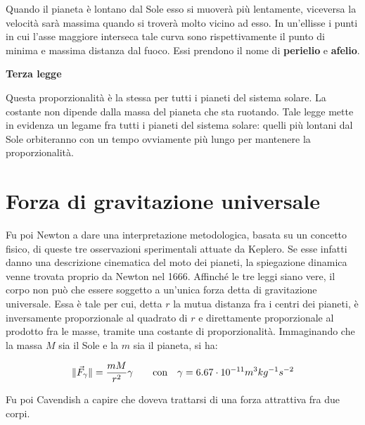 \FloatBarrier
Quando il pianeta è lontano dal Sole esso si muoverà più lentamente, viceversa la velocità sarà massima quando si troverà molto vicino ad esso. In un'ellisse i punti in cui l'asse maggiore interseca tale curva sono rispettivamente il punto di minima e massima distanza dal fuoco. Essi prendono il nome di \textbf{perielio} e \textbf{afelio}.

\textbf{Terza legge} 

\noindent{}

Questa proporzionalità è la stessa per tutti i pianeti del sistema solare. La costante non dipende dalla massa del pianeta che sta ruotando. Tale legge mette in evidenza un legame fra tutti i pianeti del sistema solare: quelli più lontani dal Sole orbiteranno con un tempo ovviamente più lungo per mantenere la proporzionalità.

\section{Forza di gravitazione universale}

Fu poi Newton a dare una interpretazione metodologica, basata su un concetto fisico, di queste tre osservazioni sperimentali attuate da Keplero. Se esse infatti danno una descrizione cinematica del moto dei pianeti, la spiegazione dinamica venne trovata proprio da Newton nel 1666. Affinché le tre leggi siano vere, il corpo non può che essere soggetto a un'unica forza detta di gravitazione universale. Essa è tale per cui, detta $r$ la mutua distanza fra i centri dei pianeti,  è inversamente proporzionale al quadrato di $r$ e direttamente proporzionale al prodotto fra le masse, tramite una costante di proporzionalità. Immaginando che la massa $M$ sia il Sole e la $m$ sia il pianeta, si ha:

\[
	\lVert\vec{F}_\gamma\rVert=\frac{mM}{r^2}\gamma \qquad \text{con} \quad\gamma=6.67 \cdot 10^{-11} m^3 kg^{-1} s^{-2}
\]

Fu poi Cavendish a capire che doveva trattarsi di una forza attrattiva fra due corpi.

